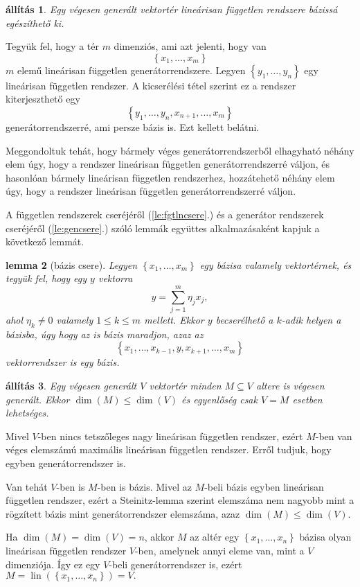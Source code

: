 \documentclass[a4paper, showtrims]{memoir}
\makeatletter
\renewenvironment{proof}[1][\proofname]
    {\par\pushQED{\qed}%
    \normalfont \topsep6\p@\@plus6\p@\relax
    \trivlist
    \item[\hskip\labelsep
        \itshape
    #1\@addpunct{:}]\ignorespaces}
    {\popQED\endtrivlist\@endpefalse}
\theoremstyle{plain}
\newtheorem{proposition}{állítás}[chapter]
\newtheorem{lemma}[proposition]{lemma}
\theoremstyle{remark}
\theoremstyle{definition}
\DeclareMathOperator{\lin}{lin}
\makeatother
\begin{document}
\begin{proposition}
	Egy végesen generált vektortér lineárisan független rendszere bázissá egészíthető ki.
	\label{pr:lfgtenbazissa}
\end{proposition}
\begin{proof}
	Tegyük fel, hogy a tér $m$ dimenziós, ami azt jelenti, hogy van
	\[
		\left\{ x_1,\ldots,x_m \right\}
	\]
	$m$ elemű lineárisan független generátorrendszere.
	Legyen $\left\{ y_1,\ldots,y_n \right\}$ egy lineárisan független rendszer.
	A kicserélési tétel szerint ez a rendszer kiterjeszthető egy
	\[
		\left\{ y_1,\ldots,y_n,x_{n+1},\ldots,x_m \right\}
	\]
	generátorrendszerré, ami persze bázis is.
	Ezt kellett belátni.
\end{proof}

Meggondoltuk tehát, hogy bármely véges generátorrendszerből elhagyható néhány elem úgy,
hogy a rendszer lineárisan független generátorrendszerré váljon,
és hasonlóan bármely lineárisan független rendszerhez, hozzátehető néhány elem úgy, hogy a
rendszer lineárisan független generátorrendszerré váljon.

A független rendszerek cseréjéről (\ref{le:fgtlncsere}.) és a generátor rendszerek cseréjéről (\ref{le:gencsere}.) szóló lemmák
együttes alkalmazásaként kapjuk a következő lemmát.

\begin{lemma}[bázis csere]\label{le:baziscsere}
	Legyen $\left\{ x_1,\ldots,x_m \right\}$ egy bázisa valamely vektortérnek,
	és tegyük fel,
	hogy egy $y$ vektorra
	\[
		y=\sum_{j=1}^m\eta_jx_j,
	\]
	ahol $\eta_k\neq 0$ valamely $1\leq k\leq m$ mellett.
	Ekkor $y$ becserélhető a $k$-adik helyen a bázisba,
	úgy hogy az is bázis maradjon, azaz az
	\[
		\left\{ x_1,\ldots,x_{k-1},y,x_{k+1},\ldots,x_m \right\}
	\]
	vektorrendszer is egy bázis.
\end{lemma}

\begin{proposition}
	Egy végesen generált $V$ vektortér minden $M\subseteq V$ altere is végesen generált.
    Ekkor $\dim(M)\leq \dim(V)$ és egyenlőség csak $V=M$ esetben lehetséges.
\end{proposition}
\begin{proof}
	Mivel $V$-ben nincs tetszőleges nagy lineárisan független rendszer,
	ezért $M$-ben van véges elemszámú maximális lineárisan független rendszer.
	Erről tudjuk, hogy egyben generátorrendszer is.

	Van tehát $V$-ben is $M$-ben is bázis.
	Mivel az $M$-beli bázis egyben lineárisan független rendszer,
	ezért a Steinitz-lemma szerint 
    elemszáma nem nagyobb mint a rögzített bázis mint generátorrendszer elemszáma,
    azaz $\dim(M)\leq \dim(V).$

    Ha $\dim(M)=\dim(V)=n$, akkor $M$ az altér egy $\left\{ x_1,\ldots,x_n \right\}$ bázisa olyan lineárisan független rendszer $V$-ben, 
    amelynek annyi eleme van, mint a $V$ dimenziója.
    Így ez egy $V$-beli generátorrendszer is, ezért 
    $M=\lin\left( \left\{ x_1,\ldots,x_n \right\}\right)=V. $
\end{proof}
\end{document}
